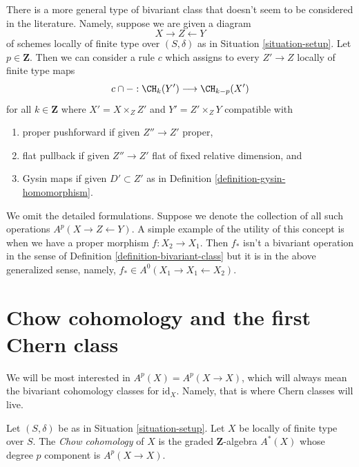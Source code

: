\begin{remark}
\label{remark-more-general-bivariant}
There is a more general type of bivariant class that doesn't seem to be
considered in the literature. Namely, suppose we are given a diagram
$$
X \longrightarrow Z \longleftarrow Y
$$
of schemes locally of finite type over $(S, \delta)$ as in
Situation \ref{situation-setup}. Let $p \in \mathbf{Z}$.
Then we can consider a rule $c$ which assigns to every $Z' \to Z$
locally of finite type maps
$$
c \cap - : \CH_k(Y') \longrightarrow \CH_{k - p}(X')
$$
for all $k \in \mathbf{Z}$
where $X' = X \times_Z Z'$ and $Y' = Z' \times_Z Y$ compatible with
\begin{enumerate}
\item proper pushforward if given $Z'' \to Z'$ proper,
\item flat pullback if given $Z'' \to Z'$ flat
of fixed relative dimension, and
\item Gysin maps if given $D' \subset Z'$ as in
Definition \ref{definition-gysin-homomorphism}.
\end{enumerate}
We omit the detailed formulations. Suppose we denote the collection
of all such operations $A^p(X \to Z \leftarrow Y)$. A simple example
of the utility of this concept is when we have a proper morphism
$f : X_2 \to X_1$. Then $f_*$ isn't a bivariant operation in the sense of
Definition \ref{definition-bivariant-class} but it is in the
above generalized sense, namely, $f_* \in A^0(X_1 \to X_1 \leftarrow X_2)$.
\end{remark}





\section{Chow cohomology and the first Chern class}
\label{section-chow-cohomology}

\noindent
We will be most interested in $A^p(X) = A^p(X \to X)$, which will always mean
the bivariant cohomology classes for $\text{id}_X$. Namely, that is where
Chern classes will live.

\begin{definition}
\label{definition-chow-cohomology}
Let $(S, \delta)$ be as in Situation \ref{situation-setup}.
Let $X$ be locally of finite type over $S$. The {\it Chow cohomology}
of $X$ is the graded $\mathbf{Z}$-algebra $A^*(X)$ whose degree
$p$ component is $A^p(X \to X)$.
\end{definition}


